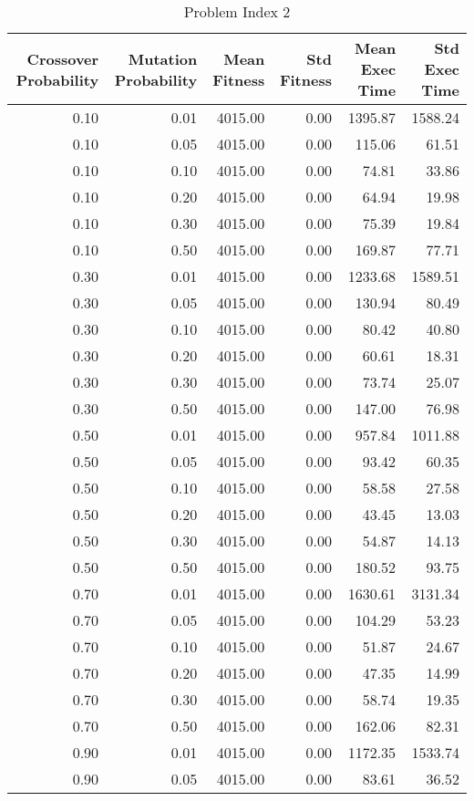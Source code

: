 \begin{table}
\caption{Problem Index 2}
\label{tab:problem_2}
\begin{tabular}{rrrrrr}
\toprule
Crossover Probability & Mutation Probability & Mean Fitness & Std Fitness & Mean Exec Time & Std Exec Time \\
\midrule
0.10 & 0.01 & 4015.00 & 0.00 & 1395.87 & 1588.24 \\
0.10 & 0.05 & 4015.00 & 0.00 & 115.06 & 61.51 \\
0.10 & 0.10 & 4015.00 & 0.00 & 74.81 & 33.86 \\
0.10 & 0.20 & 4015.00 & 0.00 & 64.94 & 19.98 \\
0.10 & 0.30 & 4015.00 & 0.00 & 75.39 & 19.84 \\
0.10 & 0.50 & 4015.00 & 0.00 & 169.87 & 77.71 \\
0.30 & 0.01 & 4015.00 & 0.00 & 1233.68 & 1589.51 \\
0.30 & 0.05 & 4015.00 & 0.00 & 130.94 & 80.49 \\
0.30 & 0.10 & 4015.00 & 0.00 & 80.42 & 40.80 \\
0.30 & 0.20 & 4015.00 & 0.00 & 60.61 & 18.31 \\
0.30 & 0.30 & 4015.00 & 0.00 & 73.74 & 25.07 \\
0.30 & 0.50 & 4015.00 & 0.00 & 147.00 & 76.98 \\
0.50 & 0.01 & 4015.00 & 0.00 & 957.84 & 1011.88 \\
0.50 & 0.05 & 4015.00 & 0.00 & 93.42 & 60.35 \\
0.50 & 0.10 & 4015.00 & 0.00 & 58.58 & 27.58 \\
0.50 & 0.20 & 4015.00 & 0.00 & 43.45 & 13.03 \\
0.50 & 0.30 & 4015.00 & 0.00 & 54.87 & 14.13 \\
0.50 & 0.50 & 4015.00 & 0.00 & 180.52 & 93.75 \\
0.70 & 0.01 & 4015.00 & 0.00 & 1630.61 & 3131.34 \\
0.70 & 0.05 & 4015.00 & 0.00 & 104.29 & 53.23 \\
0.70 & 0.10 & 4015.00 & 0.00 & 51.87 & 24.67 \\
0.70 & 0.20 & 4015.00 & 0.00 & 47.35 & 14.99 \\
0.70 & 0.30 & 4015.00 & 0.00 & 58.74 & 19.35 \\
0.70 & 0.50 & 4015.00 & 0.00 & 162.06 & 82.31 \\
0.90 & 0.01 & 4015.00 & 0.00 & 1172.35 & 1533.74 \\
0.90 & 0.05 & 4015.00 & 0.00 & 83.61 & 36.52 \\

\end{tabular}
\end{table}

